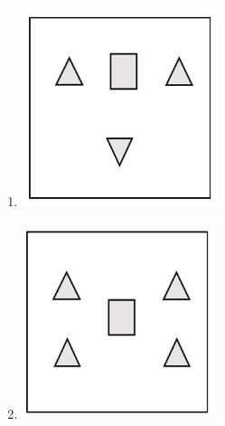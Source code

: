 \documentclass[a4paper, 11pt]{article}
\begin{document}
\begin{enumerate}
\begin{enumerate}
    \item \includegraphics[width=\columnwidth]{figs/fig_5.2.png}
    \item \includegraphics[width=\columnwidth]{figs/fig_5.3.png}

\end{enumerate}
\end{enumerate}
\end{document}
